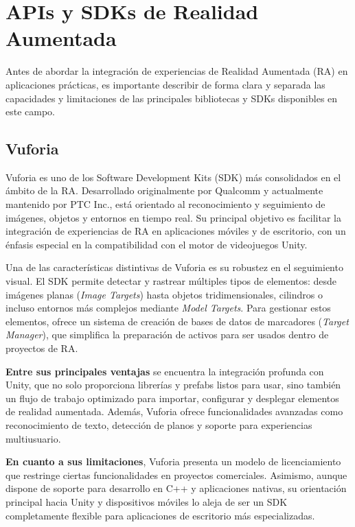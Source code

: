 \section{APIs y SDKs de Realidad Aumentada}
\label{sec:apis_ra}

Antes de abordar la integración de experiencias de Realidad Aumentada (RA) en aplicaciones prácticas, es importante describir de forma clara y separada las capacidades y limitaciones de las principales bibliotecas y SDKs disponibles en este campo.

\subsection{Vuforia}
\label{subsec:vuforia}

Vuforia \citep{Vuforia} es uno de los Software Development Kits (SDK) más consolidados en el ámbito de la RA. Desarrollado originalmente por Qualcomm y actualmente mantenido por PTC Inc., está orientado al reconocimiento y seguimiento de imágenes, objetos y entornos en tiempo real. Su principal objetivo es facilitar la integración de experiencias de RA en aplicaciones móviles y de escritorio, con un énfasis especial en la compatibilidad con el motor de videojuegos Unity.

Una de las características distintivas de Vuforia es su robustez en el seguimiento visual. El SDK permite detectar y rastrear múltiples tipos de elementos: desde imágenes planas (\textit{Image Targets}) hasta objetos tridimensionales, cilindros o incluso entornos más complejos mediante \textit{Model Targets}. Para gestionar estos elementos, ofrece un sistema de creación de bases de datos de marcadores (\textit{Target Manager}), que simplifica la preparación de activos para ser usados dentro de proyectos de RA.

\textbf{Entre sus principales ventajas} se encuentra la integración profunda con Unity, que no solo proporciona librerías y prefabs listos para usar, sino también un flujo de trabajo optimizado para importar, configurar y desplegar elementos de realidad aumentada. Además, Vuforia ofrece funcionalidades avanzadas como reconocimiento de texto, detección de planos y soporte para experiencias multiusuario.

\textbf{En cuanto a sus limitaciones}, Vuforia presenta un modelo de licenciamiento que restringe ciertas funcionalidades en proyectos comerciales. Asimismo, aunque dispone de soporte para desarrollo en C++ y aplicaciones nativas, su orientación principal hacia Unity y dispositivos móviles lo aleja de ser un SDK completamente flexible para aplicaciones de escritorio más especializadas.

